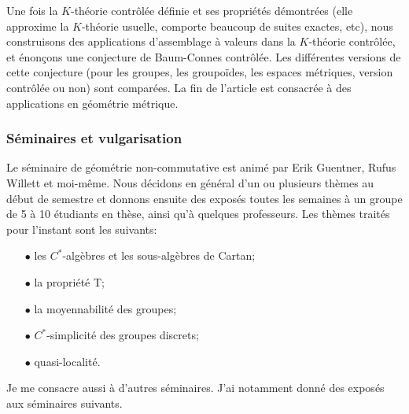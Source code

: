 \documentclass[a4paper,11pt]{article}
\begin{document}
Une fois la $K$-th\'eorie contr\^ol\'ee d\'efinie et ses propri\'et\'es d\'emontr\'ees (elle approxime la $K$-th\'eorie usuelle, comporte beaucoup de suites exactes, etc), nous construisons des applications d'assemblage \`a valeurs dans la $K$-th\'eorie contr\^ol\'ee, et \'enon\c{c}ons une conjecture de Baum-Connes contr\^ol\'ee. Les diff\'erentes versions de cette conjecture (pour les groupes, les groupo\"ides, les espaces m\'etriques, version contr\^ol\'ee ou non) sont compar\'ees. La fin de l'article est consacr\'ee \`a des applications en g\'eom\'etrie m\'etrique.  

\subsubsection*{S\'eminaires et vulgarisation}

Le s\'eminaire de g\'eom\'etrie non-commutative est anim\'e par Erik Guentner, Rufus Willett et moi-m\^eme. Nous d\'ecidons en g\'en\'eral d'un ou plusieurs th\`emes au d\'ebut de semestre et donnons ensuite des expos\'es toutes les semaines \`a un groupe de 5 \`a 10 \'etudiants en th\`ese, ainsi qu'\`a quelques professeurs. Les th\`emes trait\'es pour l'instant sont les suivants:
\begin{itemize}
\item[$\bullet$] les $C^*$-alg\`ebres et les sous-alg\`ebres de Cartan;
\item[$\bullet$] la propri\'et\'e T;
\item[$\bullet$] la moyennabilit\'e des groupes;
\item[$\bullet$] $C^*$-simplicit\'e des groupes discrets;
\item[$\bullet$] quasi-localit\'e.\\
\end{itemize}

Je me consacre aussi \`a d'autres s\'eminaires. J'ai notamment donn\'e des expos\'es aux s\'eminaires suivants.\\
\end{document}
